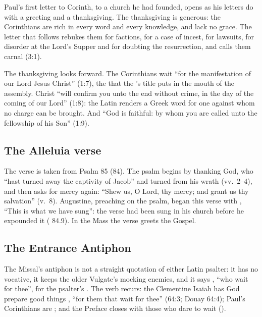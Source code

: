Paul's first letter to Corinth, to a church he had founded, opens as his letters do with a greeting and a thanksgiving. The
thanksgiving is generous: the Corinthians are rich in every word and every
knowledge, and lack no grace. The letter that follows rebukes them for
factions, for a case of incest, for lawsuits, for disorder at the Lord's
Supper and for doubting the resurrection, and calls them carnal (3:1).

The thanksgiving looks forward. The Corinthians wait ``for the manifestation
of our Lord Jesus Christ'' (1:7), the  that the 's
title puts in the mouth of the assembly. Christ ``will confirm you unto the
end without crime, in the day of the coming of our Lord'' (1:8): the Latin
 renders a Greek word for one against whom no charge can
be brought. And ``God is faithful: by whom you are called unto the fellowship
of his Son'' (1:9).

\subsection{The Alleluia verse}

The verse is taken from Psalm 85 (84). The psalm begins by thanking God, who
``hast turned away the captivity of Jacob'' and turned from his wrath
(vv.~2--4), and then asks for mercy again: ``Shew us, O Lord,
thy mercy; and grant us thy salvation'' (v.~8). Augustine, preaching on the
psalm, began this verse with , ``This is what
we have sung'': the verse had been sung in his church before he expounded it
( 84.9). In the Mass the verse greets the
Gospel.

\subsection{The Entrance Antiphon}

The Missal's antiphon is not a straight quotation of either Latin psalter: it has no vocative, it keeps the older
Vulgate's mocking enemies, and it says , ``who wait
for thee'', for the psalter's . The verb  recurs: the
Clementine Isaiah has God prepare good things , ``for
them that wait for thee'' (64:3; Douay 64:4); Paul's Corinthians are
; and the Preface closes with those who
dare to wait ().

